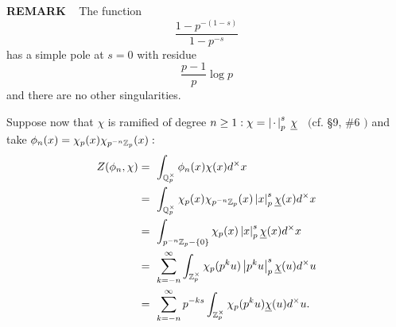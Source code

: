 \vspace{0.1cm}

\begin{x}{\small\bf REMARK} \ %
The function
\[
\frac{1 - p^{-(1-s)}}{1 - p^{-s}}
\]
has a simple pole at $s = 0$ with residue
\[
\frac{p-1}{p}\log p
\]
and there are no other singularities. 
\end{x}

\vspace{0.1cm}

Suppose now that $\chi$ is ramified of degree $n \ge 1 : \chi = \left\vert\hspace{0.05cm} \cdot \hspace{0.05cm}\right\vert_p^s$ $\underline{\chi}$ \ 
$($cf. \S9, \#6 $)$ and take $\phi_n(x) = \chi_p(x) \chi_{p^{-n} \mathbb{Z}_p}(x):$
\begin{align*}
Z(\phi_n, \chi)	
&=\  \int_{\mathbb{Q}_p^\times} \phi_n(x)  \chi(x) d^\times x\\	
&=\  \int_{\mathbb{Q}_p^\times} \chi_p(x) \chi_{p^{-n} \mathbb{Z}_p}(x) \left\vert x\right\vert_p^s\underline{\chi}(x) d^\times x\\
&=\  \int_{p^{-n}\mathbb{Z}_p-\{0\}} \chi_p(x)  \left\vert x\right\vert_p^s\underline{\chi}(x) d^\times x\\	
&=\  \sum_{k = -n}^\infty \int_{\mathbb{Z}_p^\times} \chi_p(p^ku) \left\vert p^ku\right\vert_p^s \underline{\chi}(u) d^\times u\\
&=\  \sum_{k = -n}^\infty p^{-ks}  \int_{\mathbb{Z}_p^\times} \chi_p(p^ku) \underline{\chi}(u) d^\times u.					
\end{align*}

\vspace{0.1cm}


